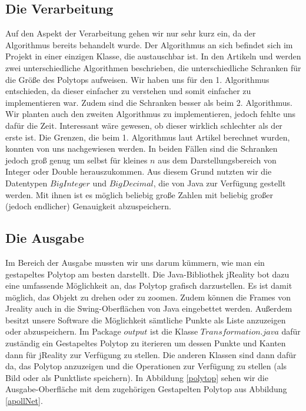 \subsection*{Die Verarbeitung}
Auf den Aspekt der Verarbeitung gehen wir nur sehr kurz ein, da der Algorithmus bereits behandelt wurde. Der Algorithmus an sich befindet sich im Projekt in einer einzigen Klasse, die austauschbar ist. In den Artikeln \cite{stackedPoly1} und \cite{stackedPoly2} werden zwei unterschiedliche Algorithmen beschrieben, die unterschiedliche Schranken für die Größe des Polytops aufweisen. Wir haben uns für den 1. Algorithmus entschieden, da dieser einfacher zu verstehen und somit einfacher zu implementieren war. Zudem sind die Schranken besser als beim 2. Algorithmus. Wir planten auch den zweiten Algorithmus zu implementieren, jedoch fehlte uns dafür die Zeit. Interessant wäre gewesen, ob dieser wirklich schlechter als der erste ist. Die Grenzen, die beim 1. Algorithmus laut Artikel berechnet wurden, konnten von uns nachgewiesen werden. In beiden Fällen sind die Schranken jedoch groß genug um selbst für kleines $n$ aus dem Darstellungsbereich von Integer oder Double herauszukommen. Aus diesem Grund nutzten wir die Datentypen $BigInteger$ und $BigDecimal$, die von Java zur Verfügung gestellt werden. Mit ihnen ist es möglich beliebig große Zahlen mit beliebig großer (jedoch endlicher) Genauigkeit abzuspeichern.

\subsection*{Die Ausgabe}
Im Bereich der Ausgabe mussten wir uns darum kümmern, wie man ein gestapeltes Polytop am besten darstellt. Die Java-Bibliothek jReality bot dazu eine umfassende Möglichkeit an, das Polytop grafisch darzustellen. Es ist damit möglich, das Objekt zu drehen oder zu zoomen. Zudem können die Frames von Jreality auch in die Swing-Oberflächen von Java eingebettet werden. Außerdem besitzt unsere Software die Möglichkeit sämtliche Punkte als Liste anzuzeigen oder abzuspeichern. Im Package $output$ ist die Klasse $Transformation.java$ dafür zuständig ein Gestapeltes Polytop zu iterieren um dessen Punkte und Kanten dann für jReality zur Verfügung zu stellen. Die anderen Klassen sind dann dafür da, das Polytop anzuzeigen und die Operationen zur Verfügung zu stellen (als Bild oder als Punktliste speichern). In Abbildung \ref{polytop} sehen wir die Ausgabe-Oberfläche mit dem zugehörigen Gestapelten Polytop aus Abbildung \ref{apollNet}.\\

